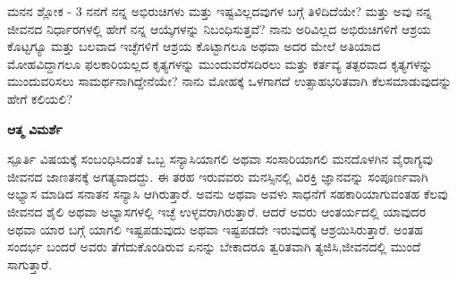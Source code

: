\begin{mananam}{\mananamfont ಮನನ ಶ್ಲೋಕ - \textenglish{3}}
\footnotesize \mananamtext ನನಗೆ ನನ್ನ ಅಭಿರುಚಿಗಳು ಮತ್ತು ಇಷ್ಟವಿಲ್ಲದವುಗಳ ಬಗ್ಗೆ ತಿಳಿದಿದೆಯೇ? ಮತ್ತು ಅವು ನನ್ನ ಜೀವನದ ನಿರ್ಧಾರಗಳಲ್ಲಿ ಹೇಗೆ ನನ್ನ ಆಯ್ಕೆಗಳನ್ನು ನಿಬಂಧಿಸುತ್ತವೆ? ನಾನು ಅರಿವಿಲ್ಲದ ಅಭಿರುಚಿಗಳಿಗೆ ಆಶ್ರಯ ಕೊಟ್ಟಗ್ಯೂ ಮತ್ತು ಬಲವಾದ ಇಚ್ಛೆಗಳಿಗೆ ಆಶ್ರಯ ಕೊಟ್ಟಾಗಲೂ ಅಥವಾ ಅದರ ಮೇಲೆ ಅತಿಯಾದ ಮೋಹವಿದ್ದಾಗಲೂ ಫಲಕಾರಿಯಲ್ಲದ ಕೃತ್ಯಗಳನ್ನು ಮುಂದುವರೆಸದಿರಲು ಮತ್ತು ಕರ್ತವ್ಯ ತತ್ಪರವಾದ ಕೃತ್ಯಗಳನ್ನು ಮುಂದುವರಿಸಲು ಸಾಮರ್ಥನಾಗಿದ್ದೇನೆಯೇ? ನಾನು ಮೋಹಕ್ಕೆ ಒಳಗಾಗದೆ ಉತ್ಸಾಹಭರಿತವಾಗಿ ಕೆಲಸಮಾಡುವುದನ್ನು ಹೇಗೆ ಕಲಿಯಲಿ?\\
\end{mananam}
\WritingHand\enspace\textbf{ಆತ್ಮ ವಿಮರ್ಶೆ}\\
\begin{inspiration}{\mananamfont ಸ್ಪೂರ್ತಿ}
\footnotesize \mananamtext ವಿಷಯಕ್ಕೆ ಸಂಬಂಧಿಸಿದಂತೆ ಒಬ್ಬ ಸನ್ಯಾಸಿಯಾಗಲಿ ಅಥವಾ ಸಂಸಾರಿಯಾಗಲಿ ಮನದೊಳಗಿನ ವೈರಾಗ್ಯವು ಜೀವನದ ಜಾಣತನಕ್ಕೆ ಅಗತ್ಯವಾದದ್ದು. ಈ ತರಹ ಇರುವವರು ಮನಸ್ಸಿನಲ್ಲಿ ವಿರಕ್ತಿ ಜ್ಞಾನವನ್ನು ಸಂಪೂರ್ಣವಾಗಿ ಅಭ್ಯಾಸ ಮಾಡಿದ ಸನಾತನ ಸನ್ಯಾಸಿ ಆಗಿರುತ್ತಾರೆ. ಅವನು ಅಥವಾ ಅವಳು ಸಾಧನೆಗೆ ಸಹಕಾರಿಯಾಗುವಂತಹ ಕೆಲವು ಜೀವನದ ಶೈಲಿ ಅಥವಾ ಅಭ್ಯಾಸಗಳಲ್ಲಿ ಇಚ್ಛೆ ಉಳ್ಳವರಾಗಿರುತ್ತಾರೆ. ಆದರೆ ಅವರು ಆಂತರ್ಯದಲ್ಲಿ ಯಾವುದರ ಅಥವಾ ಯಾರ ಬಗ್ಗೆ ಯಾಗಲಿ ಇಷ್ಟಪಡುವುದು ಅಥವಾ ಇಷ್ಟಪಡದೇ ಇರುವುದಕ್ಕೆ ಆಶ್ರಯಿಸಿರುತ್ತಾರೆ. ಅಂತಹ ಸಂದರ್ಭ ಬಂದರೆ ಅವರು ತೆಗೆದುಕೊಂಡಿರುವ ಏನನ್ನು ಬೇಕಾದರೂ ತ್ವರಿತವಾಗಿ ತ್ಯಜಿಸಿ,ಜೀವನದಲ್ಲಿ ಮುಂದೆ ಸಾಗುತ್ತಾರೆ.
\end{inspiration}
\newpage


